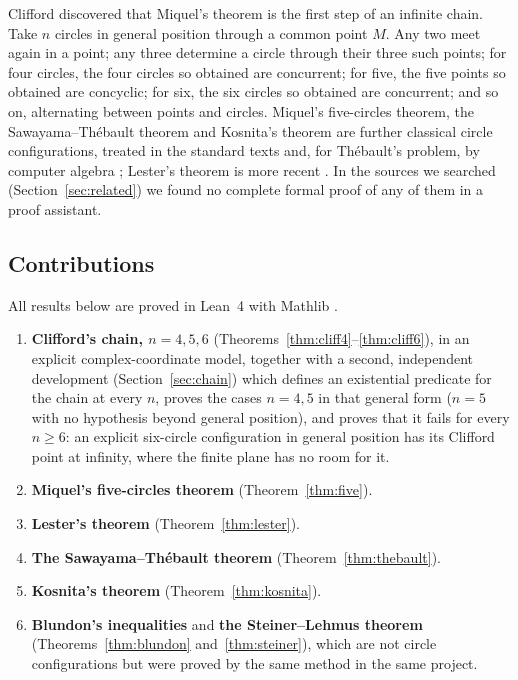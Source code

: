 \documentclass[11pt]{article}
\theoremstyle{definition}
\theoremstyle{remark}
\begin{document}
Clifford \cite{clifford1871} discovered that Miquel's theorem is the first step of an infinite chain.
Take $n$ circles in general position through a common point $M$. Any two meet again in a point;
any three determine a circle through their three such points; for four circles, the four circles so
obtained are concurrent; for five, the five points so obtained are concyclic; for six, the six circles
so obtained are concurrent; and so on, alternating between points and circles. Miquel's five-circles
theorem, the Sawayama--Th\'ebault theorem and Kosnita's theorem are further classical circle
configurations, treated in the standard texts \cite{johnson1929,pedoe1970} and, for Th\'ebault's
problem, by computer algebra \cite{chou1988}; Lester's theorem is more recent \cite{lester1997,yiu2010}.
In the sources we searched (Section~\ref{sec:related}) we found no complete formal proof of any of them
in a proof assistant.

\subsection{Contributions}
All results below are proved in Lean~4 \cite{lean4} with Mathlib \cite{mathlib2020}.
\begin{enumerate}
\item \textbf{Clifford's chain, $n=4,5,6$} (Theorems~\ref{thm:cliff4}--\ref{thm:cliff6}), in an explicit
complex-coordinate model, together with a second, independent development
(Section~\ref{sec:chain}) which defines an existential predicate for the chain at every $n$,
proves the cases $n=4,5$ in that general form ($n=5$ with no hypothesis beyond general position),
and proves that it fails for every $n\ge6$: an explicit six-circle configuration in general position has
its Clifford point at infinity, where the finite plane has no room for it.
\item \textbf{Miquel's five-circles theorem} (Theorem~\ref{thm:five}).
\item \textbf{Lester's theorem} (Theorem~\ref{thm:lester}).
\item \textbf{The Sawayama--Th\'ebault theorem} (Theorem~\ref{thm:thebault}).
\item \textbf{Kosnita's theorem} (Theorem~\ref{thm:kosnita}).
\item \textbf{Blundon's inequalities} and \textbf{the Steiner--Lehmus theorem}
(Theorems~\ref{thm:blundon} and~\ref{thm:steiner}), which are not circle configurations but were
proved by the same method in the same project.
\end{enumerate}
\end{document}
